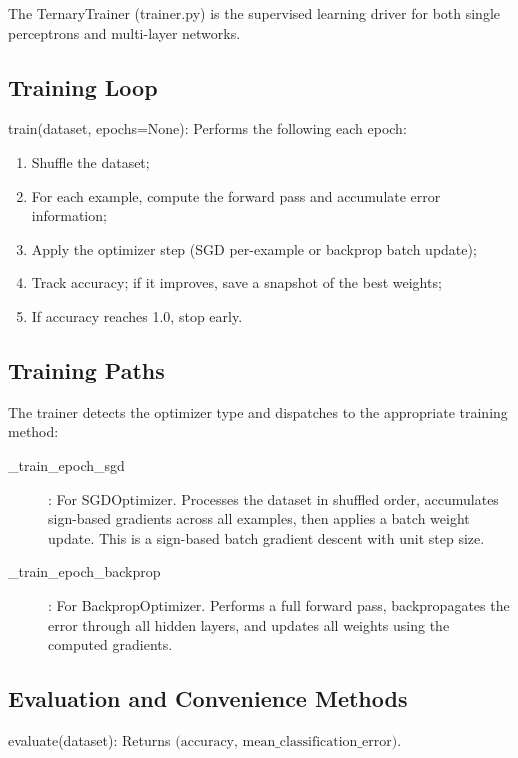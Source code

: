 \documentclass[12pt,a4paper,twoside]{book}
\theoremstyle{trinarytheorem}
\theoremstyle{trinarydefinition}
\newcommand{\code}[1]{\textsf{#1}}
\begin{document}
The \code{TernaryTrainer} (\code{trainer.py}) is the supervised
learning driver for both single perceptrons and multi-layer networks.

\subsection{Training Loop}

\noindent\code{train(dataset, epochs=None)}: Performs the following
each epoch:
\begin{enumerate}
    \item Shuffle the dataset;
    \item For each example, compute the forward pass and accumulate
          error information;
    \item Apply the optimizer step (SGD per-example or backprop batch update);
    \item Track accuracy; if it improves, save a snapshot of the
          best weights;
    \item If accuracy reaches 1.0, stop early.
\end{enumerate}

\subsection{Training Paths}

The trainer detects the optimizer type and dispatches to the appropriate
training method:
\begin{description}
    \item[\code{\_train\_epoch\_sgd}]: For \code{SGDOptimizer}.
          Processes the dataset in shuffled order, accumulates sign-based
          gradients across all examples, then applies a batch weight
          update. This is a sign-based batch gradient descent with unit
          step size.
    \item[\code{\_train\_epoch\_backprop}]: For
          \code{BackpropOptimizer}. Performs a full forward pass,
          backpropagates the error through all hidden layers, and updates
          all weights using the computed gradients.
\end{description}

\subsection{Evaluation and Convenience Methods}

\noindent\code{evaluate(dataset)}: Returns $\text{(accuracy, mean\_classification\_error)}$.
\end{document}
